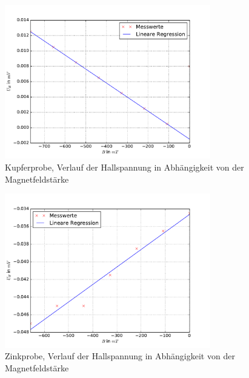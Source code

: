 
\begin{figure}
  \centering
  \includegraphics[width=0.8\textwidth]{pics/u_h_kupfer_konstI.pdf}
  \caption{Kupferprobe, Verlauf der Hallspannung in Abhängigkeit von der Magnetfeldstärke}
  \label{fig: uh_konstI_kupfer}
\end{figure}
\begin{figure}
  \centering
  \includegraphics[width=0.8\textwidth]{pics/u_h_zink_konstI.pdf}
  \caption{Zinkprobe, Verlauf der Hallspannung in Abhängigkeit von der Magnetfeldstärke}
  \label{fig: uh_konstI_zink}
\end{figure}


